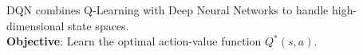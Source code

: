 \documentclass[preview]{standalone}
\begin{document}
\begin{center}
DQN combines Q-Learning with Deep Neural Networks to handle high-dimensional state spaces.
            \\
            \textbf{Objective}: Learn the optimal action-value function $Q^*(s, a)$.
\end{center}
\end{document}
